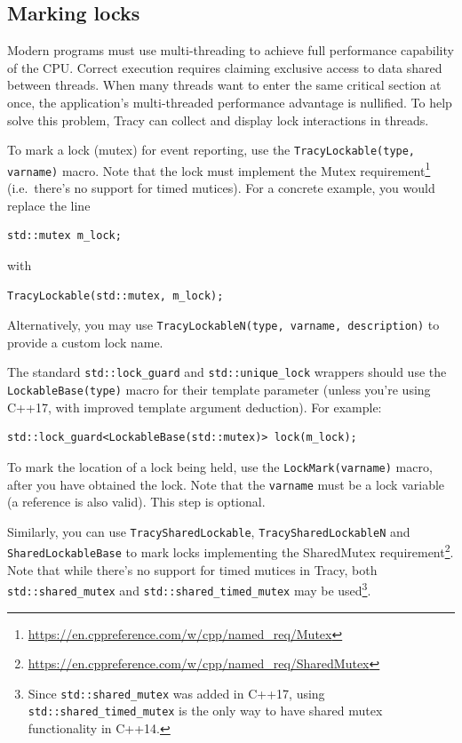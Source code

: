 \documentclass[hidelinks,titlepage,a4paper]{article}
\begin{document}
\subsection{Marking locks}

Modern programs must use multi-threading to achieve full performance capability of the CPU. Correct execution requires claiming exclusive access to data shared between threads. When many threads want to enter the same critical section at once, the application's multi-threaded performance advantage is nullified. To help solve this problem, Tracy can collect and display lock interactions in threads.

To mark a lock (mutex) for event reporting, use the \texttt{TracyLockable(type, varname)} macro. Note that the lock must implement the Mutex requirement\footnote{\url{https://en.cppreference.com/w/cpp/named_req/Mutex}} (i.e.\ there's no support for timed mutices). For a concrete example, you would replace the line

\begin{lstlisting}
std::mutex m_lock;
\end{lstlisting}

with

\begin{lstlisting}
TracyLockable(std::mutex, m_lock);
\end{lstlisting}

Alternatively, you may use \texttt{TracyLockableN(type, varname, description)} to provide a custom lock name.

The standard \texttt{std::lock\_guard} and \texttt{std::unique\_lock} wrappers should use the \texttt{LockableBase(type)} macro for their template parameter (unless you're using C++17, with improved template argument deduction). For example:

\begin{lstlisting}
std::lock_guard<LockableBase(std::mutex)> lock(m_lock);
\end{lstlisting}

To mark the location of a lock being held, use the \texttt{LockMark(varname)} macro, after you have obtained the lock. Note that the \texttt{varname} must be a lock variable (a reference is also valid). This step is optional.

Similarly, you can use \texttt{TracySharedLockable}, \texttt{TracySharedLockableN} and \texttt{SharedLockableBase} to mark locks implementing the SharedMutex requirement\footnote{\url{https://en.cppreference.com/w/cpp/named_req/SharedMutex}}. Note that while there's no support for timed mutices in Tracy, both \texttt{std::shared\_mutex} and \texttt{std::shared\_timed\_mutex} may be used\footnote{Since \texttt{std::shared\_mutex} was added in C++17, using \texttt{std::shared\_timed\_mutex} is the only way to have shared mutex functionality in C++14.}.
\end{document}
